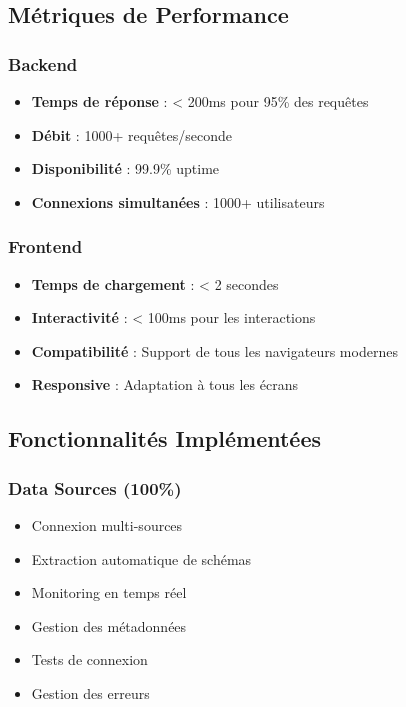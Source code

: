 \documentclass[12pt,a4paper]{article}
\begin{document}
\subsection{Métriques de Performance}

\subsubsection{Backend}
\begin{itemize}
    \item \textbf{Temps de réponse} : < 200ms pour 95\% des requêtes
    \item \textbf{Débit} : 1000+ requêtes/seconde
    \item \textbf{Disponibilité} : 99.9\% uptime
    \item \textbf{Connexions simultanées} : 1000+ utilisateurs
\end{itemize}

\subsubsection{Frontend}
\begin{itemize}
    \item \textbf{Temps de chargement} : < 2 secondes
    \item \textbf{Interactivité} : < 100ms pour les interactions
    \item \textbf{Compatibilité} : Support de tous les navigateurs modernes
    \item \textbf{Responsive} : Adaptation à tous les écrans
\end{itemize}

\subsection{Fonctionnalités Implémentées}

\subsubsection{Data Sources (100\%)}
\begin{itemize}
    \item Connexion multi-sources
    \item Extraction automatique de schémas
    \item Monitoring en temps réel
    \item Gestion des métadonnées
    \item Tests de connexion
    \item Gestion des erreurs
\end{itemize}
\end{document}
